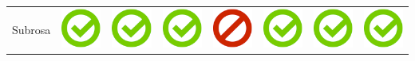 \documentclass[10pt,foldmark,tumble]{leaflet}
\begin{document}
{\begin{tabular}{ L{2cm} | C{2cm} | C{2cm} | C{2cm} | C{2cm} | C{2cm} | C{2cm} | C{2cm} | }
Subrosa & \includegraphics[scale=0.1]{pics/haken.png} & \includegraphics[scale=0.1]{pics/haken.png} & \includegraphics[scale=0.1]{pics/haken.png} & \includegraphics[scale=0.1]{pics/nohaken.png} & \includegraphics[scale=0.1]{pics/haken.png} & \includegraphics[scale=0.1]{pics/haken.png} & \includegraphics[scale=0.1]{pics/haken.png} \tabularnewline

\end{tabular}}
\end{document}
